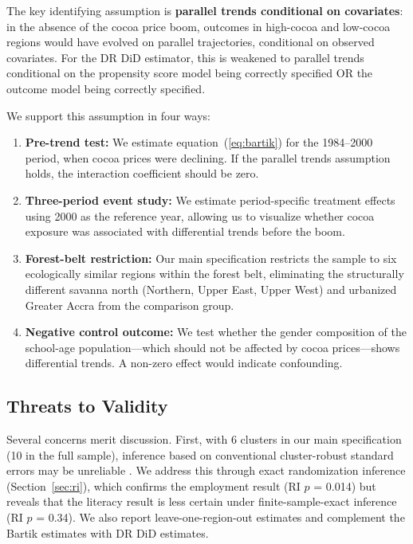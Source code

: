 \documentclass[12pt]{article}
\begin{document}
The key identifying assumption is \textbf{parallel trends conditional on covariates}: in the absence of the cocoa price boom, outcomes in high-cocoa and low-cocoa regions would have evolved on parallel trajectories, conditional on observed covariates. For the DR DiD estimator, this is weakened to parallel trends conditional on the propensity score model being correctly specified OR the outcome model being correctly specified.

We support this assumption in four ways:

\begin{enumerate}
\item \textbf{Pre-trend test:} We estimate equation~(\ref{eq:bartik}) for the 1984--2000 period, when cocoa prices were declining. If the parallel trends assumption holds, the interaction coefficient should be zero.

\item \textbf{Three-period event study:} We estimate period-specific treatment effects using 2000 as the reference year, allowing us to visualize whether cocoa exposure was associated with differential trends before the boom.

\item \textbf{Forest-belt restriction:} Our main specification restricts the sample to six ecologically similar regions within the forest belt, eliminating the structurally different savanna north (Northern, Upper East, Upper West) and urbanized Greater Accra from the comparison group.

\item \textbf{Negative control outcome:} We test whether the gender composition of the school-age population---which should not be affected by cocoa prices---shows differential trends. A non-zero effect would indicate confounding.
\end{enumerate}

\subsection{Threats to Validity}

Several concerns merit discussion. First, with 6 clusters in our main specification (10 in the full sample), inference based on conventional cluster-robust standard errors may be unreliable \citep{cameron2008, mackinnon2017}. We address this through exact randomization inference (Section~\ref{sec:ri}), which confirms the employment result (RI $p$ = 0.014) but reveals that the literacy result is less certain under finite-sample-exact inference (RI $p$ = 0.34). We also report leave-one-region-out estimates and complement the Bartik estimates with DR DiD estimates.
\end{document}
